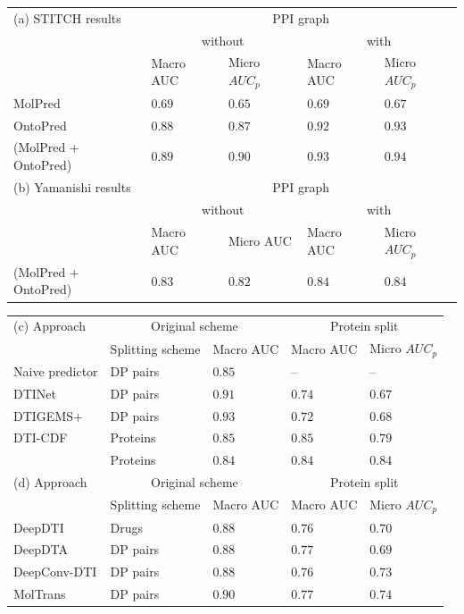 \documentclass{bioinfo}
\begin{document}
\begin{table}[!tpb]
	\begin{tabular}{|p{2.2cm}|p{0.9cm}|p{0.75cm}|p{0.9cm}|p{0.75cm}|}
		\hline
		(a) STITCH results&\multicolumn{4}{c|}{PPI graph}\\
		&\multicolumn{2}{c|}{without}&\multicolumn{2}{c|}{with}\\
		&Macro AUC&Micro $AUC_p$&Macro AUC&Micro $AUC_p$\\
		\hline
		MolPred&$0.69$&$0.65$&$0.69$&$0.67$\\
		\hline
		OntoPred&$0.88$&$0.87$&$0.92$&$0.93$\\
		\hline
		\name (MolPred + OntoPred) & $0.89$ & $0.90$&$\mathbf{0.93}$&$\mathbf{0.94}$\\
		\hline
		\hline
		(b) Yamanishi results&\multicolumn{4}{c|}{PPI graph}\\
		&\multicolumn{2}{c|}{without}&\multicolumn{2}{c|}{with}\\
		&Macro AUC&Micro AUC&Macro AUC&Micro $AUC_p$\\
		\hline
		\name (MolPred + OntoPred) & $0.83$ & $0.82$&$0.84$&$0.84$\\
		\hline
	\end{tabular} \medskip

	\begin{tabular}{|l|p{1cm}|p{1cm}|p{1cm}|p{1cm}|}
		\hline
		(c) Approach&\multicolumn{2}{c|}{Original scheme}&\multicolumn{2}{c|}{Protein split}\\
		&Splitting scheme&Macro AUC&Macro AUC&Micro $AUC_p$\\
		\hline
		Naive predictor&DP pairs&$0.85$& --&--\\
		DTINet&DP pairs&$0.91$&$0.74$&$0.67$\\
		DTIGEMS+&DP pairs&$\mathbf{0.93}$& $0.72$& $0.68$ \\
		DTI-CDF&Proteins&$0.85$&$\mathbf{0.85}$&$0.79$\\
		\name&Proteins&$0.84$&$0.84$&$\mathbf{0.84}$\\
		\hline
		\hline
		(d) Approach&\multicolumn{2}{c|}{Original scheme}&\multicolumn{2}{c|}{Protein split}\\
		&Splitting scheme&Macro AUC&Macro AUC&Micro $AUC_p$\\
		\hline
		DeepDTI&Drugs&$0.88$&$0.76$&$0.70$\\
		DeepDTA&DP pairs&$0.88$&$0.77$&$0.69$\\
		DeepConv-DTI&DP pairs&$0.88$&$0.76$&$0.73$\\
		MolTrans&DP pairs&$0.90$&$0.77$&$0.74$\\
		\hline
	\end{tabular}\\
	

\end{table}
\end{document}
